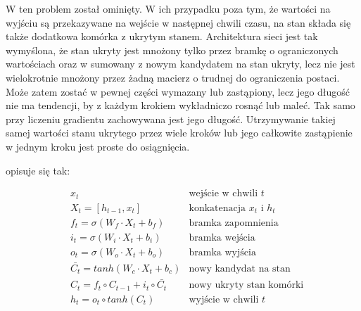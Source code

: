 W  ten problem został ominięty. W ich przypadku poza tym, że wartości na wyjściu są przekazywane
na wejście w następnej chwili czasu, na stan składa się także dodatkowa komórka z ukrytym stanem.
Architektura sieci jest tak wymyślona, że stan ukryty jest mnożony tylko przez bramkę o ograniczonych wartościach
oraz w sumowany z nowym kandydatem na stan ukryty, lecz nie jest wielokrotnie mnożony przez żadną macierz o
trudnej do ograniczenia postaci. Może zatem zostać w pewnej części wymazany lub zastąpiony, lecz jego długość
nie ma tendencji, by z każdym krokiem wykładniczo rosnąć lub maleć. Tak samo przy liczeniu gradientu
zachowywana jest jego długość. Utrzymywanie takiej samej wartości stanu ukrytego przez wiele kroków lub
jego całkowite zastąpienie w jednym kroku jest proste do osiągnięcia.

 opisuje się tak:

\begin{align*}
& x_t & \text{wejście w chwili } t\\
& X_t = [h_{t-1}, x_t] & \text{konkatenacja } x_t \text{ i } h_t\\
& f_t = \sigma(W_f \cdot X_t + b_f) & \text{bramka zapomnienia}\\
& i_t = \sigma(W_i \cdot X_t + b_i) & \text{bramka wejścia}\\
& o_t = \sigma(W_o \cdot X_t + b_o) & \text{bramka wyjścia}\\
& \bar{C_t} = tanh(W_c \cdot X_t + b_c) & \text{nowy kandydat na stan}\\
& C_t = f_t \circ C_{t-1} + i_t \circ \bar{C_t} & \text{nowy ukryty stan komórki}\\
& h_t = o_t \circ tanh(C_t) & \text{wyjście w chwili } t
\end{align*}

